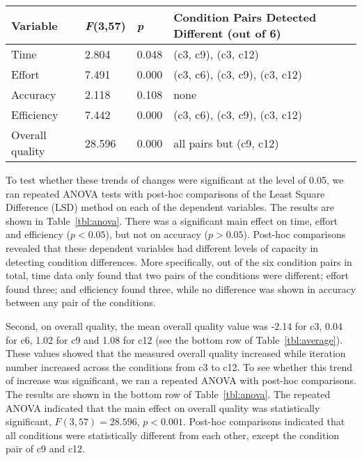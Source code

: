 \documentclass[conference,letterpaper]{IEEEtran}
\begin{document}
 
 
 \begin{table*}[!t]
\renewcommand{\arraystretch}{1.3}

\caption{Results of ANOVA with Post-Hoc Comparisons  }
\label{tbl:anova}
\centering
\begin{tabular}{l|l|l|l}

\hline
Variable & \emph{F}(3,57)  & \emph{p} & Condition Pairs Detected Different (out of 6)\\
\hline
\hline
 Time        &  2.804  &0.048        &(c3, c9), (c3, c12)   \\
 Effort      &   7.491 &0.000     & (c3, c6), (c3, c9), (c3, c12)\\
 Accuracy    &   2.118 &0.108        & none \\
 Efficiency  &   7.442 &0.000     & (c3, c6), (c3, c9), (c3, c12)  \\
\hline
 Overall quality  &  28.596 &0.000& all pairs but (c9, c12) \\
\hline
\end{tabular}
\end{table*}

To test whether these trends of changes were significant at the level of 0.05, we ran repeated ANOVA tests with post-hoc comparisons of the Least Square Difference (LSD) method on each of the dependent variables. The results are shown in Table~\ref{tbl:anova}. There was a significant main effect on time, effort and efficiency ($p < 0.05$), but not on accuracy ($p > 0.05$). Post-hoc comparisons revealed that these dependent variables had different levels of capacity in detecting condition differences. More specifically, out of the six condition pairs in total, time data only found that two pairs of the conditions were different; effort found three; and efficiency found three, while no difference was shown in accuracy between any pair of the conditions.
 
Second, on overall quality, the mean overall quality value was -2.14 for c3, 0.04 for c6, 1.02 for c9 and 1.08 for c12 (see the bottom row of Table~\ref{tbl:average}). These values showed that the measured overall quality increased while iteration number increased across the conditions from c3 to c12. To see whether this trend of increase was significant, we ran a repeated ANOVA with post-hoc comparisons. The results are shown in the bottom row of Table~\ref{tbl:anova}. The repeated ANOVA indicated that the main effect on overall quality was statistically significant, $F(3,57) = 28.596$, $p < 0.001$. Post-hoc comparisons indicated that all conditions were statistically different from each other, except the condition pair of c9 and c12. 
\end{document}
